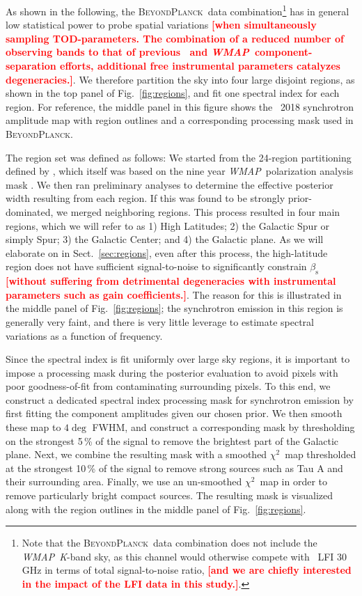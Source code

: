 \documentclass[twocolumn]{aa}
\def\WMAP{\textit{WMAP}}
\def\chisq{$\chi^2$}
\newcommand{\BP}{\textsc{BeyondPlanck}}
\newcommand{\?}[1]{\textcolor{red}{{\bf [#1]}}}
\begin{document}
As shown in the following, the \BP\ data combination\footnote{Note that the \BP\
data combination does not include the \WMAP\ \textit K-band sky, as this channel
would otherwise compete with \Planck\ LFI 30\,GHz in terms of total
signal-to-noise ratio, \textbf{\?{and we are chiefly interested in the impact of
the LFI data in this study.}}.} has in general low statistical power to probe
spatial variations \textbf{\?{when simultaneously sampling TOD-parameters. The
combination of a reduced number of observing bands to that of previous \Planck\
and \WMAP\ component-separation efforts, additional free instrumental parameters
catalyzes degeneracies.}}. We therefore partition the sky into four large
disjoint regions, as shown in the top panel of Fig.~\ref{fig:regions}, and fit
one spectral index for each region. For reference, the middle panel in this
figure shows the \Planck\ 2018 synchrotron amplitude map \citep{planck2016-l04}
with region outlines and a corresponding processing mask used in \BP. 

The region set was defined as follows: We started from the 24-region
partitioning defined by \citet{fuskeland2014}, which itself was based on the
nine year \WMAP\ polarization analysis mask \citep{bennett2012}. We then ran
preliminary analyses to determine the effective posterior width resulting from
each region. If this was found to be strongly prior-dominated, we merged
neighboring regions. This process resulted in four main regions, which we will
refer to as 1) High Latitudes; 2) the Galactic Spur or simply Spur; 3) the
Galactic Center; and 4) the Galactic plane. As we will elaborate on in
Sect.~\ref{sec:regions}, even after this process, the high-latitude region does
not have sufficient signal-to-noise to significantly constrain $\beta_{\mathrm
s}$ \textbf{\?{without suffering from detrimental degeneracies with instrumental
parameters such as gain coefficients.}}. The reason for this is illustrated in
the middle panel of Fig.~\ref{fig:regions}; the synchrotron emission in this
region is generally very faint, and there is very little leverage to estimate
spectral variations as a function of frequency.

Since the spectral index is fit uniformly over large sky regions, it is
important to impose a processing mask during the posterior evaluation to avoid
pixels with poor goodness-of-fit from contaminating surrounding pixels. To this
end, we construct a dedicated spectral index processing mask for synchrotron
emission by first fitting the component amplitudes given our chosen prior. We
then smooth these map to $4\deg$ FWHM, and construct a corresponding mask by
thresholding on the strongest 5\,\% of the signal to remove the brightest part
of the Galactic plane. Next, we combine the resulting mask with a smoothed
\chisq\ map thresholded at the strongest 10\,\% of the signal to remove strong
sources such as Tau A and their surrounding area. Finally, we use an
un-smoothed \chisq\ map in order to remove particularly bright compact sources.
The resulting mask is visualized along with the region outlines in the middle
panel of Fig.~\ref{fig:regions}.
\end{document}
